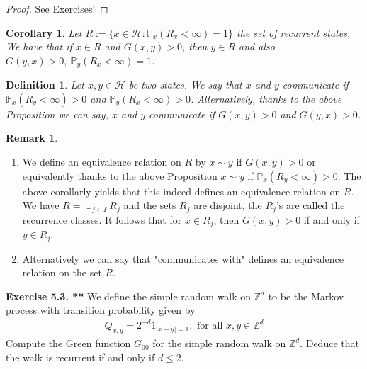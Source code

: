 \documentclass[11pt,a4paper, final]{article}
\newtheorem{cor}{Corollary}[section]
\newtheorem{defn}{Definition}[section]
\theoremstyle{definition}
\newtheorem{rem}{Remark}[section]
\begin{document}
\begin{proof}
See Exercises!
\end{proof}
\begin{cor}
Let $R:= \lbrace x \in \mathcal{H} : \mathbb{P}_x ( R_x < \infty) = 1 \rbrace$ the set of recurrent states. We have that if $x \in R$ and $G(x,y) > 0$, then $y \in R$ and also $G(y,x)>0,  \ \mathbb{P}_y(R_x < \infty ) =1$. 
\end{cor}
\begin{defn} Let $x,y \in \mathcal{H}$ be two states. We say that $x$ and $y$ communicate if $\mathbb{P}_x(R_y< \infty)>0$ and $\mathbb{P}_y(R_x < \infty)>0$. Alternatively, thanks to the above Proposition we can say, $x$ and $y$ communicate if $G(x,y) >0$ and $G(y,x) >0$. 
\end{defn}
\begin{rem} \ \begin{enumerate} \item  We define an equivalence relation on $R$ by $x \sim y$ if $G(x,y) >0$ or equivalently thanks to the above Proposition $x \sim y$ if $\mathbb{P}_x(R_y < \infty)>0$. The above corollarly yields that this indeed defines an equivalence relation on $R$. We have $R = \cup_{j \in I} R_j$ and the sets $R_j$ are disjoint, the $R_j$'s are called the recurrence classes.  It follows that for $x \in R_j$, then $G(x,y) >0$ if and only if $y \in R_j$.
\item Alternatively we can say that "communicates with" defines an equivalence relation on the set $R$. 
\end{enumerate}
\end{rem}
\noindent \textbf{Exercise 5.3. **} We define the simple random walk on $\mathbb{Z}^d$ to be the Markov process with transition probability given by 
\begin{align*}
Q_{x,y} = 2^{-d} 1_{|x-y|=1}, \text{ for all } x,y \in \mathbb{Z}^d
\end{align*}
Compute the Green function $G_{00}$ for the simple random walk on $\mathbb{Z}^d$. Deduce that the walk is recurrent if and only if $d \leq 2$. 
\newpage 
\end{document}
